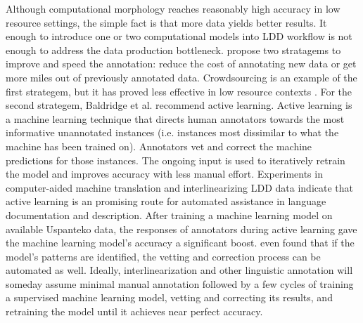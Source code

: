\documentclass[12pt]{article}
\begin{document}
Although computational morphology reaches reasonably high accuracy in low resource settings, the simple fact is that more data yields better results. It enough to introduce one or two computational models into LDD workflow is not enough to address the data production bottleneck.  propose two stratagems to improve and speed the annotation: reduce the cost of annotating new data or get more miles out of previously annotated data. Crowdsourcing is an example of the first strategem, but it has proved less effective in low resource contexts \cite{bird_aikuma:_2014,bettinson_developing_2017}. For the second strategem, Baldridge et al. recommend active learning. Active learning is a machine learning technique that directs human annotators towards the most informative unannotated instances (i.e. instances most dissimilar to what the machine has been trained on). Annotators vet and correct the machine predictions for those instances. The ongoing input is used to iteratively retrain the model and improves accuracy with less manual effort. Experiments in computer-aided machine translation \cite{kothur_document-level_2018} and interlinearizing LDD data \cite{palmer_semi-automated_2009,palmer_evaluating_2009,palmer_computational_2010} indicate that active learning is an promising route for automated assistance in language documentation and description. After training a machine learning model on available Uspanteko data,  the responses of annotators during active learning gave the machine learning model's accuracy a significant boost.  even found that if the model's patterns are identified, the vetting and correction process can be automated as well. Ideally, interlinearization and other linguistic annotation will someday assume  minimal manual annotation followed by a few cycles of training a supervised machine learning model, vetting and correcting its results, and retraining the model until it achieves near perfect accuracy. 
\end{document}
